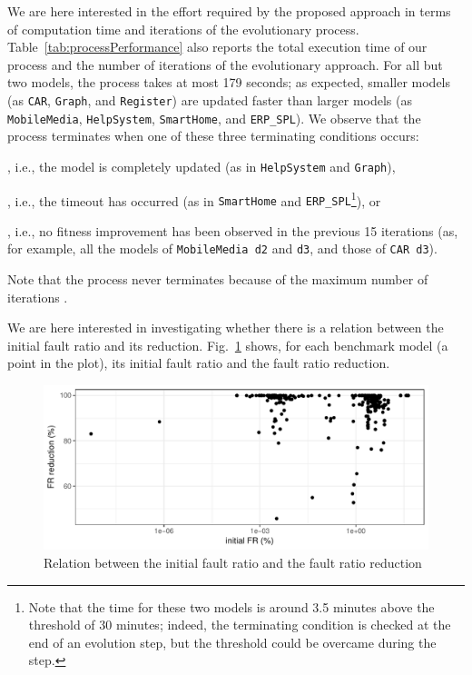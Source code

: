\begin{tikzborder}{\cite{Gargantini16:validation}}
\begin{tikzborder}{\cite{gargantini_combinatorial_2017}}
\begin{tikzborder}{\cite{garn2019}}
\begin{tikzborder}{\cite{arcaini2019achieving}}
	We are here interested in the effort required by the proposed approach in terms of computation time and iterations of the evolutionary process. Table~\ref{tab:processPerformance} also reports the total execution time of our process and the number of iterations of the evolutionary approach. For all but two models, the process takes at most 179 seconds; as expected, smaller models (as {\tt CAR}, {\tt Graph}, and {\tt Register}) are updated faster than larger models (as {\tt Mobile\-Media}, {\tt Help\-System}, {\tt Smart\-Home}, and {\tt ERP\_SPL}). We observe that the process terminates when one of these three terminating conditions occurs:
	\begin{inparaenum}[(i)]
		\item \thF, i.e., the model is completely updated (as in {\tt Help\-System} and {\tt Graph}),
		\item \thT, i.e., the timeout has occurred (as in {\tt Smart\-Home} and {\tt ERP\_SPL}\footnote{Note that the time for these two models is around 3.5 minutes above the threshold \thT of 30 minutes; indeed, the terminating condition is checked at the end of an evolution step, but the threshold could be overcame during the step.}), or
		\item \thNI, i.e., no fitness improvement has been observed in the previous 15 iterations (as, for example, all the models of {\tt Mobile\-Media d2} and {\tt d3}, and those of {\tt CAR d3}).
	\end{inparaenum}
	Note that the process never terminates because of the maximum number of iterations \thI.
	
	
	We are here interested in investigating whether there is a relation between the initial fault ratio and its reduction. Fig.~\ref{fig:frRepair} shows, for each benchmark model (a point in the plot), its initial fault ratio and the fault ratio reduction. \be
	
	\begin{figure}[h]
		\centering
		\includegraphics[width=.8\textwidth]{frRepairRed}
		\caption{Relation between the initial fault ratio and the fault ratio reduction}
		\label{fig:frRepair}
	\end{figure}
	

\end{tikzborder}
\end{tikzborder}
\end{tikzborder}
\end{tikzborder}
